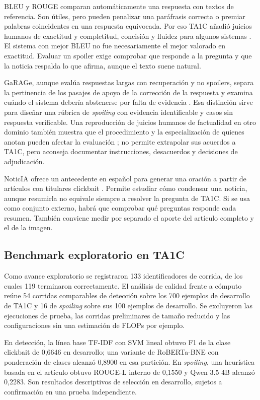 BLEU y ROUGE comparan automáticamente una respuesta con textos de referencia. Son útiles, pero pueden penalizar una paráfrasis correcta o premiar palabras coincidentes en una respuesta equivocada. Por eso TA1C añadió juicios humanos de exactitud y completitud, concisión y fluidez para algunos sistemas \citep{ta1c2025}. El sistema con mejor BLEU no fue necesariamente el mejor valorado en exactitud. Evaluar un spoiler exige comprobar que responde a la pregunta y que la noticia respalda lo que afirma, aunque el texto suene natural.

GaRAGe, aunque evalúa respuestas largas con recuperación y no spoilers, separa la pertinencia de los pasajes de apoyo de la corrección de la respuesta y examina cuándo el sistema debería abstenerse por falta de evidencia \citep{sorodoc2025garage}. Esa distinción sirve para diseñar una rúbrica de \emph{spoiling} con evidencia identificable y casos sin respuesta verificable. Una reproducción de juicios humanos de factualidad en otro dominio también muestra que el procedimiento y la especialización de quienes anotan pueden afectar la evaluación \citep{florescu2025reprohum}; no permite extrapolar sus acuerdos a TA1C, pero aconseja documentar instrucciones, desacuerdos y decisiones de adjudicación.

NoticIA ofrece un antecedente en español para generar una oración a partir de artículos con titulares clickbait \citep{garciaferrero2024}. Permite estudiar cómo condensar una noticia, aunque resumirla no equivale siempre a resolver la pregunta de TA1C. Si se usa como conjunto externo, habrá que comprobar qué preguntas responde cada resumen. También conviene medir por separado el aporte del artículo completo y el de la imagen.

\subsection{Benchmark exploratorio en TA1C}

Como avance exploratorio se registraron 133 identificadores de corrida, de los cuales 119 terminaron correctamente. El análisis de calidad frente a cómputo reúne 54 corridas comparables de detección sobre los 700 ejemplos de desarrollo de TA1C y 16 de \emph{spoiling} sobre sus 100 ejemplos de desarrollo. Se excluyeron las ejecuciones de prueba, las corridas preliminares de tamaño reducido y las configuraciones sin una estimación de FLOPs por ejemplo.

En detección, la línea base TF-IDF con SVM lineal obtuvo F1 de la clase clickbait de 0,6646 en desarrollo; una variante de RoBERTa-BNE con ponderación de clases alcanzó 0,8900 en esa partición. En \emph{spoiling}, una heurística basada en el artículo obtuvo ROUGE-L interno de 0,1550 y Qwen 3.5 4B alcanzó 0,2283. Son resultados descriptivos de selección en desarrollo, sujetos a confirmación en una prueba independiente.


